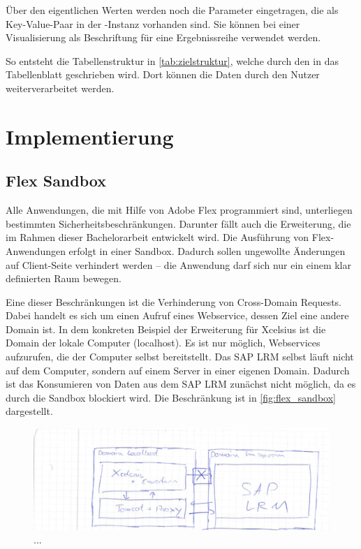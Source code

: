 \begin{onehalfspacing}
Über den eigentlichen Werten werden noch die Parameter eingetragen, die als Key-Value-Paar in der -Instanz vorhanden sind. Sie können bei einer Visualisierung als Beschriftung für eine Ergebnissreihe verwendet werden.

So entsteht die Tabellenstruktur in \vref{tab:zielstruktur}, welche durch den  in das Tabellenblatt geschrieben wird. Dort können die Daten durch den Nutzer weiterverarbeitet werden.

\section{Implementierung}
\subsection{Flex Sandbox}
Alle Anwendungen, die mit Hilfe von Adobe Flex programmiert sind, unterliegen bestimmten Sicherheitsbeschränkungen. Darunter fällt auch die Erweiterung, die im Rahmen dieser Bachelorarbeit entwickelt wird. Die Ausführung von Flex-Anwendungen erfolgt in einer Sandbox. Dadurch sollen ungewollte Änderungen auf Client-Seite verhindert werden -- die Anwendung darf sich nur ein einem klar definierten Raum bewegen.


Eine dieser Beschränkungen ist die Verhinderung von Cross-Domain Requests. Dabei handelt es sich um einen Aufruf eines Webservice, dessen Ziel eine andere Domain ist. In dem konkreten Beispiel der Erweiterung für \gls{Xcelsius} ist die Domain der lokale Computer (localhost). Es ist nur möglich, Webservices aufzurufen, die der Computer selbst bereitstellt. Das SAP LRM selbst läuft nicht auf dem Computer, sondern auf einem Server in einer eigenen Domain. Dadurch ist das Konsumieren von Daten aus dem SAP LRM zunächst nicht möglich, da es durch die Sandbox blockiert wird. Die Beschränkung ist in \vref{fig:flex_sandbox} dargestellt.

\begin{figure}[h]
\centering
\setlength{\unitlength}{1mm}
\includegraphics[width=15cm]{images/flex_sandbox.png}
\caption{...\label{fig:flex_sandbox}}
\end{figure}  


\end{onehalfspacing}
